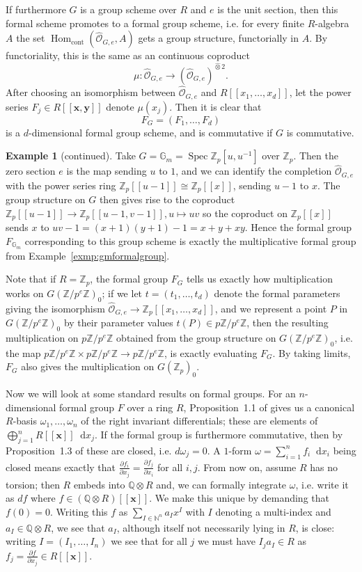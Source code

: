 \documentclass[12pt]{article}
\newcommand{\N}{\mathbb{N}}
\newcommand{\Z}{\mathbb{Z}}
\renewcommand{\G}{\mathbb{G}}
\newcommand{\Q}{\mathbb{Q}}
\newcommand{\vx}{\mathbf{x}}
\newcommand{\vy}{\mathbf{y}}
\renewcommand{\O}{\mathcal{O}}
\newcommand*\diff{\mathop{}\!\mathrm{d}}
\newcommand{\tensor}{\otimes}
\DeclareMathOperator{\Hom}{Hom}
\DeclareMathOperator{\Spec}{Spec}
\theoremstyle{plain}
\theoremstyle{definition}
\newtheorem{exmp}[thm]{Example} %
\theoremstyle{remark}
\begin{document}
If furthermore $G$ is a group scheme over $R$ and $e$ is the unit section, then this formal scheme promotes to a formal group scheme, i.e. for every finite $R$-algebra $A$ the set $\Hom_{\text{cont}}(\widehat{\O}_{G,e},A)$ gets a group structure, functorially in $A$. By functoriality, this is the same as an continuous coproduct \[\mu: \widehat{\O}_{G,e} \to \left(\widehat{\O}_{G,e}\right)^{\widehat{\tensor} 2}.\]
After choosing an isomorphism between $\widehat{\O}_{G,e}$ and $R[[x_1,\dots,x_d]]$, let the power series $F_j \in R[[\vx,\vy]]$ denote $\mu(x_j)$. Then it is clear that \[F_G = (F_1,\dots,F_d)\] is a $d$-dimensional formal group scheme, and is commutative if $G$ is commutative.
\addtocounter{thm}{-3}
\begin{exmp}[continued]
\label{exmp:gmtoformal}
Take $G = \G_m = \Spec \Z_p[u,u^{-1}]$ over $\Z_p$. Then the zero section $e$ is the map sending $u$ to $1$, and we can identify the completion $\widehat{\O}_{G,e}$ with the power series ring $\Z_p[[u-1]] \cong \Z_p[[x]]$, sending $u-1$ to $x$. The group structure on $G$ then gives rise to the coproduct $\Z_p[[u-1]] \to \Z_p[[u-1,v-1]], u \mapsto uv$ so the coproduct on $\Z_p[[x]]$ sends $x$ to $uv-1 = (x+1)(y+1) -1 = x + y + xy$. Hence the formal group $F_{\G_m}$ corresponding to this group scheme is exactly the multiplicative formal group from Example~\ref{exmp:gmformalgroup}.
\end{exmp}

Note that if $R = \Z_p$, the formal group $F_G$ tells us exactly how multiplication works on $G(\Z/p^e\Z)_0$; if we let $t = (t_1,\dots,t_d)$ denote the formal parameters giving the isomorphism $\widehat{\O}_{G,e} \to \Z_p[[x_1,\dots,x_d]]$, and we represent a point $P$ in $G(\Z/p^e\Z)_0$ by their parameter values $t(P) \in p\Z/p^e\Z$, then the resulting multiplication on $p\Z/p^e\Z$ obtained from the group structure on $G(\Z/p^e\Z)_0$, i.e. the map $p\Z/p^e\Z \times p\Z/p^e\Z \to p\Z/p^e\Z$, is exactly evaluating $F_G$. By taking limits, $F_G$ also gives the multiplication on $G(\Z_p)_0$.

Now we will look at some standard results on formal groups. For an $n$-dimensional formal group $F$ over a ring $R$, Proposition~1.1 of \cite{honda70} gives us a canonical $R$-basis $\omega_1,\dots,\omega_n$ of the right invariant differentials; these are elements of $\bigoplus_{j=1}^n R[[\vx]] \diff x_j$. If the formal group is furthermore commutative, then by Proposition~1.3 of \cite{honda70} these are closed, i.e. $d\omega_j = 0$. A $1$-form $\omega = \sum_{i=1}^n f_i \diff x_i$ being closed means exactly that $\frac{\partial f_i}{\partial x_j} = \frac{\partial f_j}{\partial x_i}$ for all $i,j$. From now on, assume $R$ has no torsion; then $R$ embeds into $\Q \tensor R$ and, we can formally integrate $\omega$, i.e. write it as $df$ where $f \in (\Q\tensor R)[[\vx]]$. We make this unique by demanding that $f(0) = 0$. Writing this $f$ as $\sum_{I \in \N^n} a_I x^I$ with $I$ denoting a multi-index and $a_I \in \Q\tensor R$, we see that $a_I$, although itself not necessarily lying in $R$, is close: writing $I = (I_1,\dots,I_n)$ we see that for all $j$ we must have $I_j a_I \in R$ as $f_j = \frac{\partial f}{\partial x_j} \in R[[\vx]]$.
\end{document}
